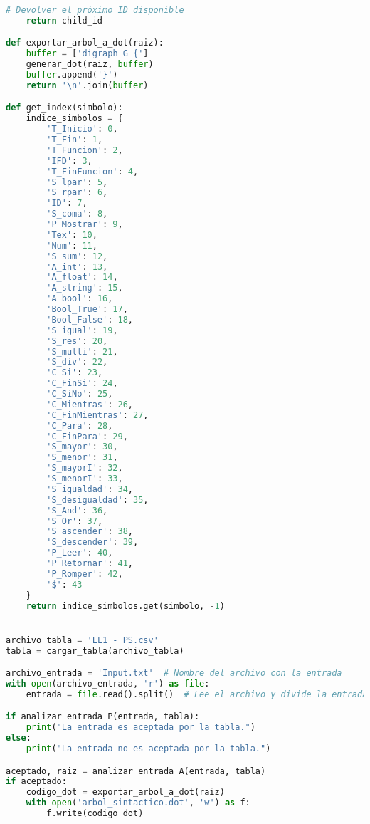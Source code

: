 \documentclass{article}
\begin{document}
\begin{description}
\begin{lstlisting}[language=Python, caption=Funcion: Analisis (main2)]
    # Devolver el próximo ID disponible
    return child_id

def exportar_arbol_a_dot(raiz):
    buffer = ['digraph G {']
    generar_dot(raiz, buffer)
    buffer.append('}')
    return '\n'.join(buffer)

def get_index(simbolo):
    indice_simbolos = {
        'T_Inicio': 0,
        'T_Fin': 1,
        'T_Funcion': 2,
        'IFD': 3,
        'T_FinFuncion': 4,
        'S_lpar': 5,
        'S_rpar': 6,
        'ID': 7,
        'S_coma': 8,
        'P_Mostrar': 9,
        'Tex': 10,
        'Num': 11,
        'S_sum': 12,
        'A_int': 13,
        'A_float': 14,
        'A_string': 15,
        'A_bool': 16,
        'Bool_True': 17,
        'Bool_False': 18,
        'S_igual': 19,
        'S_res': 20,
        'S_multi': 21,
        'S_div': 22,
        'C_Si': 23,
        'C_FinSi': 24,
        'C_SiNo': 25,
        'C_Mientras': 26,
        'C_FinMientras': 27,
        'C_Para': 28,
        'C_FinPara': 29,
        'S_mayor': 30,
        'S_menor': 31,
        'S_mayorI': 32,
        'S_menorI': 33,
        'S_igualdad': 34,
        'S_desigualdad': 35,
        'S_And': 36,
        'S_Or': 37,
        'S_ascender': 38,
        'S_descender': 39,
        'P_Leer': 40,
        'P_Retornar': 41,
        'P_Romper': 42,
        '$': 43
    }
    return indice_simbolos.get(simbolo, -1)


archivo_tabla = 'LL1 - PS.csv'
tabla = cargar_tabla(archivo_tabla)

archivo_entrada = 'Input.txt'  # Nombre del archivo con la entrada
with open(archivo_entrada, 'r') as file:
    entrada = file.read().split()  # Lee el archivo y divide la entrada en tokens

if analizar_entrada_P(entrada, tabla):
    print("La entrada es aceptada por la tabla.")
else:
    print("La entrada no es aceptada por la tabla.")

aceptado, raiz = analizar_entrada_A(entrada, tabla)
if aceptado:
    codigo_dot = exportar_arbol_a_dot(raiz)
    with open('arbol_sintactico.dot', 'w') as f:
        f.write(codigo_dot)
\end{lstlisting}
\end{description}

\clearpage
\end{document}
